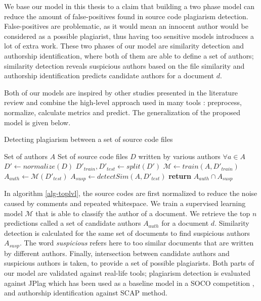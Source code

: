 
We base our model in this thesis to a claim that building a two phase model can reduce the amount of false-positives found in source code plagiarism detection. False-positives are problematic, as it would mean an innocent author would be considered as a possible plagiarist, thus having too sensitive models introduces a lot of extra work. These two phases of our model are similarity detection and authorship identification, where both of them are able to define a set of authors; similarity detection reveals suspicious authors based on the file similarity and authorship identification predicts candidate authors for a document $d$. 


Both of our models are inspired by other studies presented in the literature review and combine the high-level approach used in many tools \cite{RSCAD2016}: preprocess, normalize, calculate metrics and predict. The generalization of the proposed model is given below.

\begin{algorithm}[ht]
\caption{Detecting plagiarism between a set of source code files}
\label{alg-toplvl}
\begin{algorithmic}

\Require Set of authors $A$
\Require Set of source code files $D$ written by various authors $\forall a \in A$
   \State $D'\gets normalize(D)$
   \State $D'_{train}, D'_{test} \gets split(D')$
   \State $\mathcal{M} \gets train(A, D'_{train})$
   \State $A_{auth} \gets \mathcal{M}(D'_{test})$
   \State $A_{susp} \gets detectSim(A, D'_{test})$
   \State \textbf{return} $A_{auth} \cap A_{susp}$
\EndProcedure

\end{algorithmic}
\end{algorithm}

\noindent
In algorithm \ref{alg-toplvl}, the source codes are first normalized to reduce the noise caused by \eg comments and repeated whitespace. We train a supervised learning model $\mathcal{M}$ that is able to classify the author of a document. We retrieve the top $n$ predictions called a set of candidate authors $A_{auth}$ for a document $d$. Similarity detection is calculated for the same set of documents to find suspicious authors $A_{susp}$. The word \emph{suspicious} refers here to too similar documents that are written by different authors. Finally, intersection between candidate authors and suspicious authors is taken, to provide a set of possible plagiarists. Both parts of our model are validated against real-life tools; plagiarism detection is evaluated against JPlag \cite{prechelt2002finding} which has been used as a baseline model in a SOCO competition \cite{saez2014pan}, and authorship identification against SCAP method.

